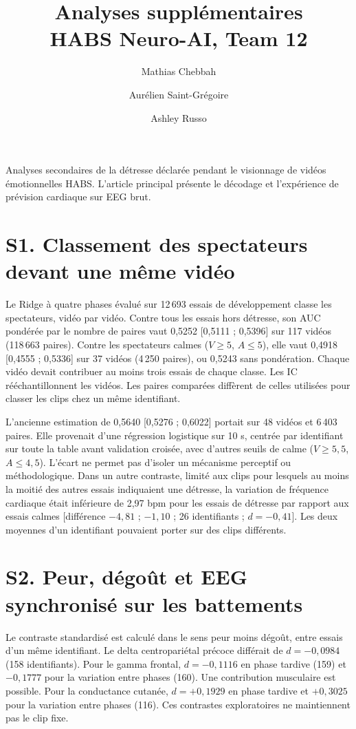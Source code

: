 \documentclass[10pt]{article}
\title{Analyses supplémentaires\\\large HABS Neuro-AI, Team 12}
\author{Mathias Chebbah \and Aurélien Saint-Grégoire \and Ashley Russo}
\date{}
\begin{document}
\maketitle
Analyses secondaires de la détresse déclarée pendant le visionnage de vidéos émotionnelles HABS. L’article principal présente le décodage et l’expérience de prévision cardiaque sur EEG brut.
\section*{S1. Classement des spectateurs devant une même vidéo}
Le Ridge à quatre phases évalué sur 12\,693 essais de développement classe les spectateurs, vidéo par vidéo. Contre tous les essais hors détresse, son AUC pondérée par le nombre de paires vaut 0,5252 [0,5111 ; 0,5396] sur 117 vidéos (118\,663 paires). Contre les spectateurs calmes ($V\ge5$, $A\le5$), elle vaut 0,4918 [0,4555 ; 0,5336] sur 37 vidéos (4\,250 paires), ou 0,5243 sans pondération. Chaque vidéo devait contribuer au moins trois essais de chaque classe. Les IC rééchantillonnent les vidéos. Les paires comparées diffèrent de celles utilisées pour classer les clips chez un même identifiant.

L’ancienne estimation de 0,5640 [0,5276 ; 0,6022] portait sur 48 vidéos et 6\,403 paires. Elle provenait d’une régression logistique sur 10 s, centrée par identifiant sur toute la table avant validation croisée, avec d’autres seuils de calme ($V\ge5{,}5$, $A\le4{,}5$). L’écart ne permet pas d’isoler un mécanisme perceptif ou méthodologique. Dans un autre contraste, limité aux clips pour lesquels au moins la moitié des autres essais indiquaient une détresse, la variation de fréquence cardiaque était inférieure de 2,97 bpm pour les essais de détresse par rapport aux essais calmes [différence $-4{,}81$ ; $-1{,}10$ ; 26 identifiants ; $d=-0{,}41$]. Les deux moyennes d’un identifiant pouvaient porter sur des clips différents.
\section*{S2. Peur, dégoût et EEG synchronisé sur les battements}
Le contraste standardisé est calculé dans le sens peur moins dégoût, entre essais d’un même identifiant. Le delta centropariétal précoce différait de $d=-0{,}0984$ (158 identifiants). Pour le gamma frontal, $d=-0{,}1116$ en phase tardive (159) et $-0{,}1777$ pour la variation entre phases (160). Une contribution musculaire est possible. Pour la conductance cutanée, $d=+0{,}1929$ en phase tardive et $+0{,}3025$ pour la variation entre phases (116). Ces contrastes exploratoires ne maintiennent pas le clip fixe.
\end{document}
